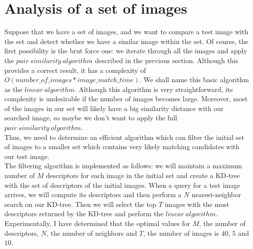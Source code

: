  
\section{Analysis of a set of images}

Suppose that we have a set of images, and we want to compare a test image with the set and detect whether we have a similar image within the set. Of course, the first possibility is the brut force one: we iterate through all the images and apply the $pair\ similarity\ algorithm$ described in the previous section. Although this provides a correct result, it has a complexity of $O(number\_of\_images * image\_match\_time)$. We shall name this basic algorithm as the $linear\ algorithm$. Although this algorithm is very straightforward, its complexity is undesirable if the number of images becomes large. Moreover, most of the images in our set will likely have a big similarity distance with our searched image, so maybe we don't want to apply the full $pair\ similarity\ algorithm$.\\
Thus, we need to determine an efficient algorithm which can filter the initial set of images to a smaller set which contains very likely matching candidates with our test image.\\
The filtering algorithm is implemented as follows: we will maintain a maximum number of $M$ descriptors for each image in the initial set and create a KD-tree with the set of descriptors of the initial images. When a query for a test image arrives, we will compute its descriptors and then perform a $N$ nearest-neighbor search on our KD-tree. Then we will select the top $T$ images with the most descriptors returned by the KD-tree and perform the $linear\ algorithm$. Experimentally, I have determined that the optimal values for $M$, the number of descriptors, $N$, the number of neighbors and $T$, the number of images is $40$, $5$ and $10$.
 
 